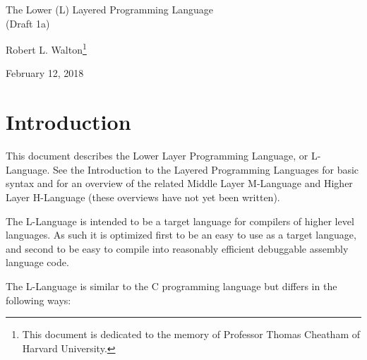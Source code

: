 \documentclass[12pt]{article}
\makeatletter
\renewcommand\tableofcontents{%
    \begin{list}{}%
	     {\setlength{\itemsep}{0in}%
	      \setlength{\topsep}{0in}%
	      \setlength{\parsep}{1ex}%
	      \setlength{\labelwidth}{0in}%
	      \setlength{\baselineskip}{1.5ex}%
	      \setlength{\leftmargin}{1.0in}%
	      \setlength{\rightmargin}{1.0in}}%
    \item\@starttoc{toc}%
    \end{list}}
\makeatother
\begin{document}
        
\begin{center}

{\Large
The Lower (L) Layered Programming Language \\[0.5ex]
(Draft 1a)}

\medskip

Robert L. Walton\footnote{This document is dedicated to the memory
of Professor Thomas Cheatham of Harvard University.}

February 12, 2018
 
\end{center}

{\small \tableofcontents}

\newpage

\section{Introduction}

This document describes the Lower Layer Programming Language, or
L-Language.  See the Introduction to the Layered
Programming Languages for basic syntax and for an overview of the related
Middle Layer M-Language and Higher Layer H-Language (these overviews
have not yet been written).

The L-Language is intended to be a target language for compilers of
higher level languages.  As such it is optimized first to be an easy to 
use as a target language, and second to be easy to
compile into reasonably efficient debuggable assembly language code.

The L-Language is similar to the C programming language
but differs in the following ways:
\end{document}
